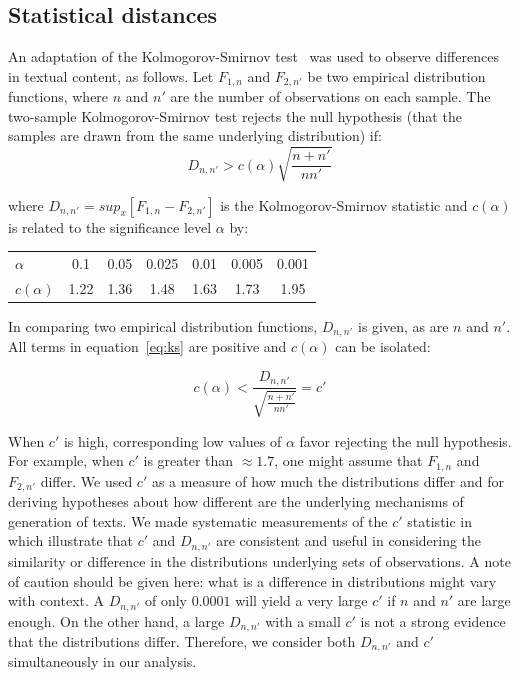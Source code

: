 \documentclass[review]{elsarticle}
\begin{document}
\subsection{Statistical distances}
An adaptation of the Kolmogorov-Smirnov test~\cite{kolm} was used to observe differences in textual content, as follows.
Let $F_{1,n}$ and $F_{2,n'}$ be two empirical distribution functions, where $n$ and $n'$ are the number of observations on each sample.
The two-sample Kolmogorov-Smirnov test rejects the null hypothesis (that the samples are drawn from the same underlying distribution) if:
\begin{equation}\label{eq:ks}
D_{n,n'} > c(\alpha)\sqrt{\frac{n+n'}{nn'}}
\end{equation}

\noindent where $D_{n,n'}=sup_x[F_{1,n}-F_{2,n'}]$ is the Kolmogorov-Smirnov statistic
and $c(\alpha)$ is related to the significance level $\alpha$ by:

\begin{table}[H]
\centering
\begin{tabular}{l||c|c|c|c|c|c}\hline
$\alpha$ & 0.1 & 0.05 & 0.025 & 0.01 & 0.005 & 0.001 \\
$c(\alpha)$ & 1.22 & 1.36 & 1.48 & 1.63 & 1.73 & 1.95 \\\hline
\end{tabular}
\end{table}

In comparing two empirical distribution functions,
$D_{n,n'}$ is given, as are $n$ and $n'$.
All terms in equation~\ref{eq:ks} are positive and $c(\alpha)$ can be isolated:

\begin{equation}\label{eq:ks2}
c(\alpha) < \frac{D_{n,n'}}{\sqrt{\frac{n+n'}{nn'}}} = c'
\end{equation}

When $c'$ is high, corresponding low values of $\alpha$ favor rejecting the null hypothesis.
For example, when $c'$ is greater than $\approx 1.7$, one might assume that $F_{1,n}$ and $F_{2,n'}$ differ.
We used $c'$ as a measure of how much
the distributions differ
and for deriving hypotheses
about how different are the underlying mechanisms of generation of texts.
We made systematic measurements of the $c'$ statistic in~\cite{kolmSmir}
which illustrate that $c'$ and $D_{n,n'}$ are consistent and useful in considering the
similarity or difference in the distributions underlying sets of observations.
A note of caution should be given here: what is a difference in distributions
might vary with context.
A $D_{n,n'}$ of only $0.0001$ will yield a very large $c'$ if $n$ and $n'$ are large enough.
On the other hand, a large $D_{n,n'}$ with a small $c'$ is not a strong evidence that
the distributions differ.
Therefore, we consider both $D_{n,n'}$ and $c'$ simultaneously in our analysis.
\end{document}
